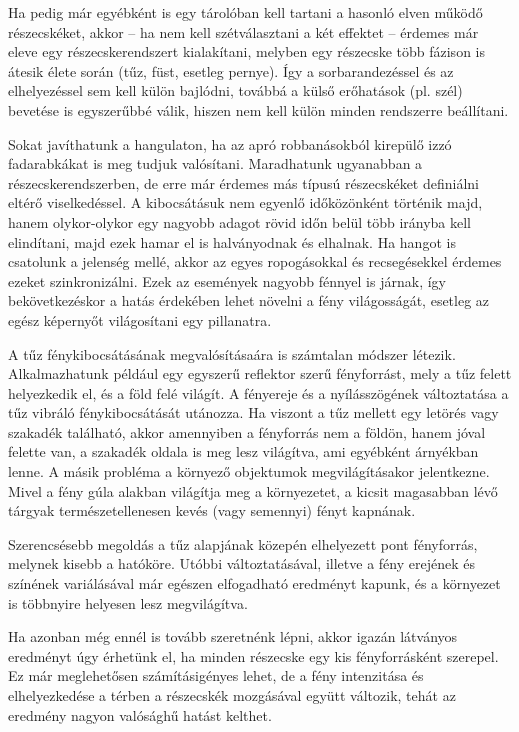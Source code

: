 Ha pedig már egyébként is egy tárolóban kell tartani a hasonló elven működő részecskéket, akkor -- ha nem kell szétválasztani a két effektet -- érdemes már eleve egy részecskerendszert kialakítani, melyben egy részecske több fázison is átesik élete során (tűz, füst, esetleg pernye). Így a sorbarandezéssel és az elhelyezéssel sem kell külön bajlódni, továbbá a külső erőhatások (pl. szél) bevetése is egyszerűbbé válik, hiszen nem kell külön minden rendszerre beállítani.

Sokat javíthatunk a hangulaton, ha az apró robbanásokból kirepülő izzó fadarabkákat is meg tudjuk valósítani. Maradhatunk ugyanabban a részecskerendszerben, de erre már érdemes más típusú részecskéket definiálni eltérő viselkedéssel. A kibocsátásuk nem egyenlő időközönként történik majd, hanem olykor-olykor egy nagyobb adagot rövid időn belül több irányba kell elindítani, majd ezek hamar el is halványodnak és elhalnak. Ha hangot is csatolunk a jelenség mellé, akkor az egyes ropogásokkal és recsegésekkel érdemes ezeket szinkronizálni. Ezek az események nagyobb fénnyel is járnak, így bekövetkezéskor a hatás érdekében lehet növelni a fény világosságát, esetleg az egész képernyőt világosítani egy pillanatra. 

A tűz fénykibocsátásának megvalósításaára is számtalan módszer létezik. Alkalmazhatunk például egy egyszerű reflektor szerű fényforrást, mely a tűz felett helyezkedik el, és a föld felé világít. A fényereje és a nyílásszögének változtatása a tűz vibráló fénykibocsátását utánozza. Ha viszont a tűz mellett egy letörés vagy szakadék található, akkor amennyiben a fényforrás nem a földön, hanem jóval felette van, a szakadék oldala is meg lesz világítva, ami egyébként árnyékban lenne. A másik probléma a környező objektumok megvilágításakor jelentkezne. Mivel a fény gúla alakban világítja meg a környezetet, a kicsit magasabban lévő tárgyak természetellenesen kevés (vagy semennyi) fényt kapnának.

Szerencsésebb megoldás a tűz alapjának közepén elhelyezett pont fényforrás, melynek kisebb a hatóköre. Utóbbi változtatásával, illetve a fény erejének és színének variálásával már egészen elfogadható eredményt kapunk, és a környezet is többnyire helyesen lesz megvilágítva.

Ha azonban még ennél is tovább szeretnénk lépni, akkor igazán látványos eredményt úgy érhetünk el, ha minden részecske egy kis fényforrásként szerepel. Ez már meglehetősen számításigényes lehet, de a fény intenzitása és elhelyezkedése a térben a részecskék mozgásával együtt változik, tehát az eredmény nagyon valósághű hatást kelthet.



















